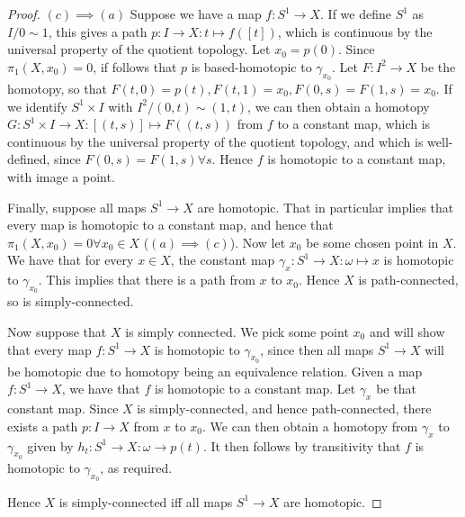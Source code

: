 \documentclass{article}
\begin{document}
\begin{proof}
$(c)\implies (a)$ Suppose we have a map $f:S^1\to X$. If we define $S^1$ as $I/0\sim 1$, this gives a path $p:I\to X:t\mapsto f([t])$, which is continuous by the universal property of the quotient topology. Let $x_0=p(0)$. Since $\pi_1(X,x_0)=0$, if follows that $p$ is based-homotopic to $\gamma_{x_0}$. Let $F:I^2\to X$ be the homotopy, so that $F(t,0)=p(t),F(t,1)=x_0,F(0,s)=F(1,s)=x_0$. If we identify $S^1\times I$ with $I^2/(0,t)\sim (1,t)$, we can then obtain a homotopy $G:S^1\times I\to X:[(t,s)]\mapsto F((t,s))$ from $f$ to a constant map, which is continuous by the universal property of the quotient topology, and which is well-defined, since $F(0,s)=F(1,s)\forall s$. Hence $f$ is homotopic to a constant map, with image a point.

Finally, suppose all maps $S^1\to X$ are homotopic. That in particular implies that every map is homotopic to a constant map, and hence that $\pi_1(X,x_0)=0\forall x_0\in X$ ($(a)\implies(c)$). Now let $x_0$ be some chosen point in $X$. We have that for every $x\in X$, the constant map $\gamma_x:S^1\to X:\omega\mapsto x$ is homotopic to $\gamma_{x_0}$. This implies that there is a path from $x$ to $x_0$. Hence $X$ is path-connected, so is simply-connected.

Now suppose that $X$ is simply connected. We pick some point $x_0$ and will show that every map $f:S^1\to X$ is homotopic to $\gamma_{x_0}$, since then all maps $S^1\to X$ will be homotopic due to homotopy being an equivalence relation. Given a map $f:S^1\to X$, we have that $f$ is homotopic to a constant map. Let $\gamma_x$ be that constant map. Since $X$ is simply-connected, and hence path-connected, there exists a path $p:I\to X$ from $x$ to $x_0$. We can then obtain a homotopy from $\gamma_x$ to $\gamma_{x_0}$ given by $h_t:S^1\to X:\omega\to p(t)$. It then follows by transitivity that $f$ is homotopic to $\gamma_{x_0}$, as required.

Hence $X$ is simply-connected iff all maps $S^1\to X$ are homotopic.
\end{proof}
\end{document}
